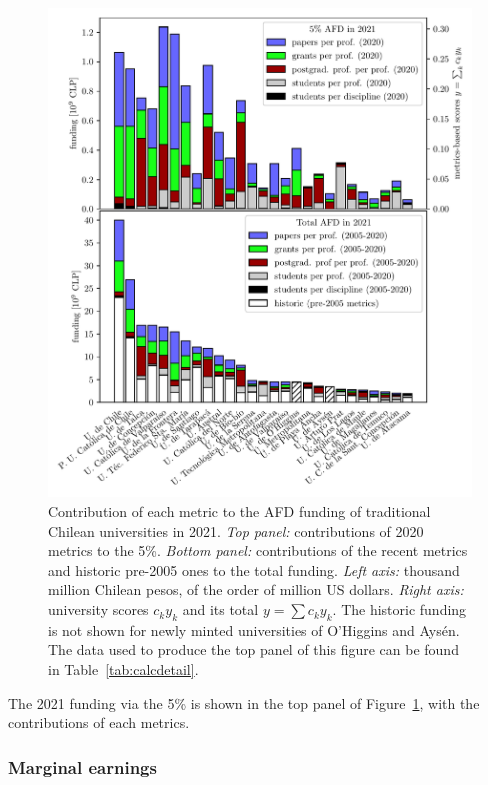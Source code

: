 \documentclass[twocolumn]{article}
\begin{document}
\begin{figure}[p]
\centering
\includegraphics{pdf/afd-coefficients.pdf}
\caption{Contribution of each metric to the AFD funding of traditional Chilean universities in 2021. \textit{Top panel:} contributions of 2020 metrics to the 5\%. \textit{Bottom panel:} contributions of the recent metrics and historic pre-2005 ones to the total funding. \textit{Left axis:} thousand million Chilean pesos, of the order of million US dollars. \textit{Right axis:} university scores $c_k y_k$ and its total $y = \sum c_k y_k$. The historic funding is not shown for newly minted universities of O'Higgins and Aysén.  The data used to produce the top panel of this figure can be found in Table~\ref{tab:calcdetail}.}
\label{fig:coeff}
\end{figure}

The 2021 funding via the 5\% is shown in the top panel of Figure~\ref{fig:coeff}, with the contributions of each metrics.

\subsubsection{Marginal earnings}
\label{sec:marginal} 
\end{document}
